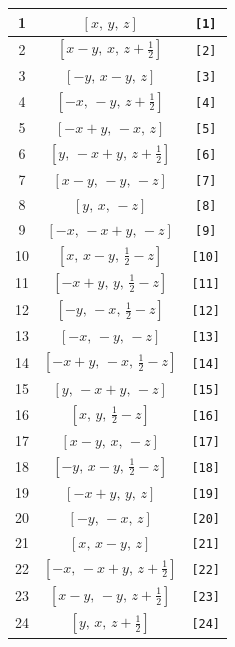 \documentclass[fleqn,8pt]{jsarticle}
\begin{document}
\begin{longtable}{ccc}
1 & $\left[ x,\, y,\, z \right]$ & {\tt [1]} \\ \hline
2 & $\left[ x - y,\, x,\, z + \frac{1}{2} \right]$ & {\tt [2]} \\ \hline
3 & $\left[ - y,\, x - y,\, z \right]$ & {\tt [3]} \\ \hline
4 & $\left[ - x,\, - y,\, z + \frac{1}{2} \right]$ & {\tt [4]} \\ \hline
5 & $\left[ - x + y,\, - x,\, z \right]$ & {\tt [5]} \\ \hline
6 & $\left[ y,\, - x + y,\, z + \frac{1}{2} \right]$ & {\tt [6]} \\ \hline
7 & $\left[ x - y,\, - y,\, - z \right]$ & {\tt [7]} \\ \hline
8 & $\left[ y,\, x,\, - z \right]$ & {\tt [8]} \\ \hline
9 & $\left[ - x,\, - x + y,\, - z \right]$ & {\tt [9]} \\ \hline
10 & $\left[ x,\, x - y,\, \frac{1}{2} - z \right]$ & {\tt [10]} \\ \hline
11 & $\left[ - x + y,\, y,\, \frac{1}{2} - z \right]$ & {\tt [11]} \\ \hline
12 & $\left[ - y,\, - x,\, \frac{1}{2} - z \right]$ & {\tt [12]} \\ \hline
13 & $\left[ - x,\, - y,\, - z \right]$ & {\tt [13]} \\ \hline
14 & $\left[ - x + y,\, - x,\, \frac{1}{2} - z \right]$ & {\tt [14]} \\ \hline
15 & $\left[ y,\, - x + y,\, - z \right]$ & {\tt [15]} \\ \hline
16 & $\left[ x,\, y,\, \frac{1}{2} - z \right]$ & {\tt [16]} \\ \hline
17 & $\left[ x - y,\, x,\, - z \right]$ & {\tt [17]} \\ \hline
18 & $\left[ - y,\, x - y,\, \frac{1}{2} - z \right]$ & {\tt [18]} \\ \hline
19 & $\left[ - x + y,\, y,\, z \right]$ & {\tt [19]} \\ \hline
20 & $\left[ - y,\, - x,\, z \right]$ & {\tt [20]} \\ \hline
21 & $\left[ x,\, x - y,\, z \right]$ & {\tt [21]} \\ \hline
22 & $\left[ - x,\, - x + y,\, z + \frac{1}{2} \right]$ & {\tt [22]} \\ \hline
23 & $\left[ x - y,\, - y,\, z + \frac{1}{2} \right]$ & {\tt [23]} \\ \hline
24 & $\left[ y,\, x,\, z + \frac{1}{2} \right]$ & {\tt [24]} \\ \hline

\end{longtable}
\end{document}
